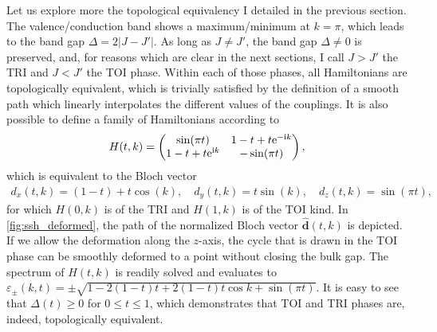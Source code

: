 Let us explore more the topological equivalency I detailed in the previous section.
The valence/conduction band shows a maximum/minimum at $k=\pi$, which leads to the band gap $\Delta = 2\left|J-J'\right|$.
As long as $J\neq J'$, the band gap $\Delta\neq0$ is preserved, and, for reasons which are clear in the next sections, I call $J>J'$ the TRI and $J<J'$ the TOI phase.
Within each of those phases, all Hamiltonians are topologically equivalent, which is trivially satisfied by the definition of a smooth path which linearly interpolates the different values of the couplings.
It is also possible to define a family of Hamiltonians according to
\begin{align}
    H(t,k) =
    \begin{pmatrix}
        \sin(\pi t) & 1-t + t\mathrm e^{-\mathrm i k} \\
        1-t + t\mathrm e^{\mathrm i k} & -\sin(\pi t)
    \end{pmatrix},
    \label{eq:hamiltonian_path}
\end{align}
which is equivalent to the Bloch vector
\begin{align}
    d_x(t,k) = (1-t)+t\cos(k),
    \quad
    d_y(t,k) = t\sin(k),
    \quad
    d_z(t,k) = \sin(\pi t),
\end{align}
for which $H(0,k)$ is of the TRI and $H(1,k)$ is of the TOI kind.
In \cref{fig:ssh_deformed}, the path of the normalized Bloch vector $\hat{\bm d}(t,k)$ is depicted.
If we allow the deformation along the $z$-axis, the cycle that is drawn in the TOI phase can be smoothly deformed to a point without closing the bulk gap.
The spectrum of $H(t,k)$ is readily solved and evaluates to $\varepsilon_\pm(k,t)=\pm\sqrt{1-2(1-t)t+2(1-t)t\cos k+\sin(\pi t)}$.
It is easy to see that $\Delta({t})\geq0$ for $0\leq t\leq1$, which demonstrates that TOI and TRI phases are, indeed, topologically equivalent.

